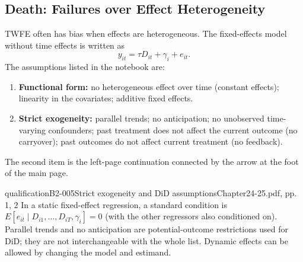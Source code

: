 \subsection{Death: Failures over Effect Heterogeneity}
TWFE often has bias when effects are heterogeneous. The fixed-effects model without time effects is written as
\[
y_{it}=\tau D_{it}+\gamma_i+e_{it}.
\]
The assumptions listed in the notebook are:
\begin{enumerate}
\item \textbf{Functional form:} no heterogeneous effect over time (constant effects); linearity in the covariates; additive fixed effects.
\item \textbf{Strict exogeneity:} parallel trends; no anticipation; no unobserved time-varying confounders; past treatment does not affect the current outcome (no carryover); past outcomes do not affect current treatment (no feedback).
\end{enumerate}
The second item is the left-page continuation connected by the arrow at the foot of the main page.
\begin{reviewnote}{qualification}{B2-005}{Strict exogeneity and DiD assumptions}{Chapter24-25.pdf, pp. 1, 2}
In a static fixed-effect regression, a standard condition is \(E[e_{it}\mid D_{i1},\ldots,D_{iT},\gamma_i]=0\) (with the other regressors also conditioned on). Parallel trends and no anticipation are potential-outcome restrictions used for DiD; they are not interchangeable with the whole list. Dynamic effects can be allowed by changing the model and estimand.
\par{}
\end{reviewnote}


